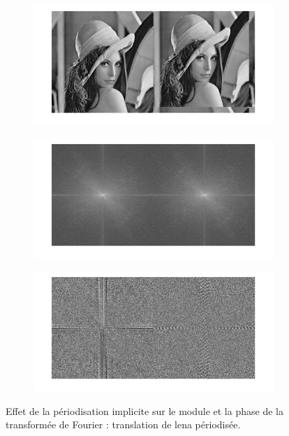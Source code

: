 \documentclass[12pt,a4paper,onecolumn]{article}
\begin{document}
\begin{figure}[H]
	\centering
	\begin{subfigure}[b]{\textwidth}
		\centering
		\includegraphics[height = 0.24\textheight]{8_3_images}
		\label{8_3_images}
	\end{subfigure}
	\begin{subfigure}[b]{\textwidth}
		\centering
		\includegraphics[height = 0.24\textheight]{8_3_mod}
		\label{8_3_mod}
	\end{subfigure}
	\begin{subfigure}[b]{\textwidth}
		\centering
		\includegraphics[height = 0.24\textheight]{8_3_phase}
		\label{8_3_phase}
	\end{subfigure}
	\caption{Effet de la périodisation implicite sur le module et la phase de la transformée de Fourier : translation de lena périodisée.}
	\label{8_3}
\end{figure}
\end{document}
